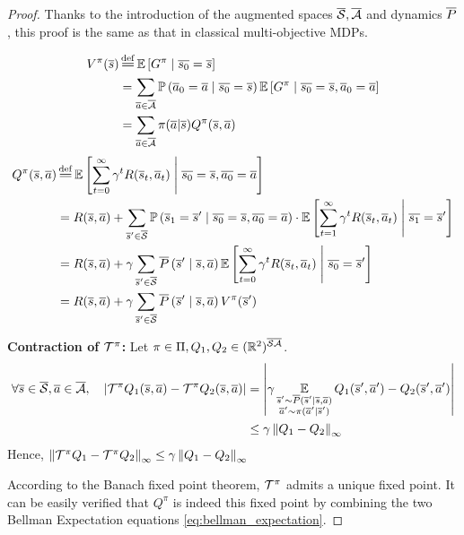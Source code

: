 \begin{proof}
Thanks to the introduction of the augmented spaces $\overline{\mathcal{S}}, \overline{\mathcal{A}}$ and dynamics $\overline{P}$, this proof is the same as that in classical multi-objective MDPs.

\begin{align*}
    V^\pi(\os) &\eqdef \expectedvalue\left[ G^\pi \condbar \ov{s_0} = \os\right] \\
    &=\sum_{\oa\in\ocA} \probability{\oa_0 = \oa \condbar\ov{s_0} = \os} \expectedvalue\left[ G^\pi \condbar \ov{s_0} = \os, \oa_0 = \oa\right]\\
    &= \sum_{\oa\in\ocA} \pi(\oa | \os) Q^\pi(\os,\oa)
\end{align*}
\begin{align*}
    Q^\pi(\os, \oa) &\eqdef \expectedvalue\left[\sum_{t=0}^\infty \gamma^t R(\os_t, \oa_t)\condbar \ov{s_0} = \os, \ov{a_0} = \oa\right] \\
    &= R(\os, \oa) + \sum_{\os'\in\ocS}\probability{\os_1 = \os' \condbar\ov{s_0} = \os, \ov{a_0} = \oa}\cdot \expectedvalue\left[\sum_{t=1}^\infty \gamma^t R(\os_t, \oa_t)\condbar \ov{s_1} = \os'\right] \\
    &= R(\os, \oa) + \gamma\sum_{\os'\in\ocS}\ov{P}\left(\os' \condbar\os, \oa\right) \expectedvalue\left[\sum_{t=0}^\infty \gamma^t R(\os_t, \oa_t) \condbar \ov{s_0} = \os'\right] \\
    &=  R(\os, \oa) + \gamma\sum_{\os'\in\ocS}\ov{P}\left(\os' \condbar\os, \oa\right) V^\pi(\os')
\end{align*}

\textbf{Contraction of $\mathcal{T}^\pi$:}
Let $\pi\in\Pi, Q_1, Q_2\in(\mathbb{R}^2)^{\overline{\mathcal{S}}\overline{\mathcal{A}}}$.
\begin{align*}
    \forall \overline{s}\in\overline{\mathcal{S}}, \overline{a}\in\overline{\mathcal{A}},\quad \left|\mathcal{T}^\pi Q_1(\overline{s},\overline{a}) - \mathcal{T}^\pi Q_2(\overline{s},\overline{a})\right| &= \left|\gamma\operatorname*{\mathbb{E}}\limits_{\substack{\overline{s}'\sim\overline{P}(\overline{s}'|\overline{s},\overline{a}) \\ \overline{a}'\sim\pi(\overline{a}'|\overline{s}')}} Q_1(\overline{s}',\overline{a}') - Q_2(\overline{s}',\overline{a}')\right|\\
    &\leq \gamma\left\|Q_1-Q_2\right\|_\infty
\end{align*}
Hence, $\left\|\mathcal{T}^\pi Q_1  - \mathcal{T}^\pi Q_2 \right\|_\infty \leq \gamma\left\|Q_1-Q_2\right\|_\infty$

According to the Banach fixed point theorem, $\mathcal{T}^\pi$ admits a unique fixed point.
It can be easily verified that $Q^\pi$ is indeed this fixed point by combining the two Bellman Expectation equations \eqref{eq:bellman_expectation}.

\end{proof}

